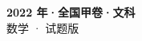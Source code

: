 \documentclass[zihao=-4, a4paper]{ctexart}
\begin{document}
\begin{center}
  {\Large\bfseries 2022 年·全国甲卷·文科}\\[4pt]
  {\large 数学 · 试题版}
\end{center}
\medskip
{}

\end{document}

